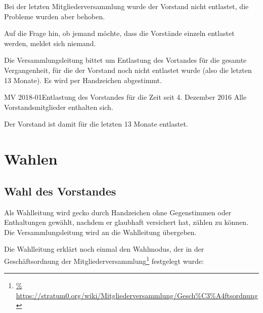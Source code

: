 \documentclass{s0minutes}
\begin{document}
Bei der letzten Mitgliederversammlung wurde der Vorstand nicht entlastet, die
Probleme wurden aber behoben.

Auf die Frage hin, ob jemand möchte, dass die Vorstände einzeln entlastet
werden, meldet sich niemand.

Die Versammlungsleitung bittet um Entlastung des Vortandes für die gesamte
Vergangenheit, für die der Vorstand noch nicht entlastet wurde (also die letzten
13 Monate). Es wird per Handzeichen abgestimmt.

\begin{resolution}{MV 2018-01}{}{Entlastung des
  Vorstandes für die Zeit seit 4. Dezember 2016\hfill}{}
  Alle Vorstandsmitglieder enthalten sich.
\end{resolution}

Der Vorstand ist damit für die letzten 13 Monate entlastet.

\section{Wahlen}

\subsection{Wahl des Vorstandes}

Als Wahlleitung wird gecko durch Handzeichen ohne Gegenstimmen oder
Enthaltungen gewählt, nachdem er glaubhaft versichert hat, zählen zu können.
Die Versammlungsleitung wird an die Wahlleitung übergeben.

Die Wahlleitung erklärt noch einmal den Wahlmodus, der in der Geschäftsordnung
der Mitgliederversammlung\footnote{\url{%
https://stratum0.org/wiki/Mitgliederversammlung/Gesch\%C3\%A4ftsordnung}}
festgelegt wurde:
\end{document}
